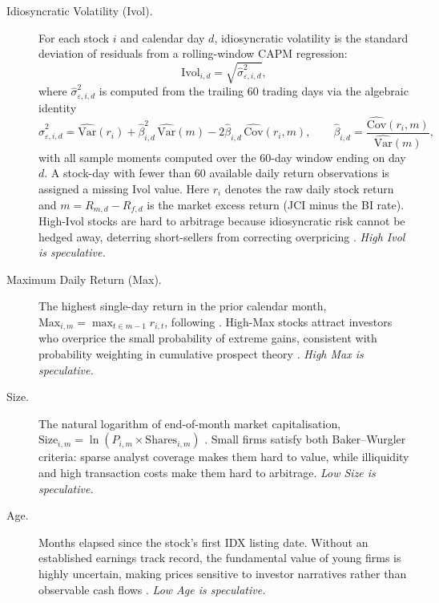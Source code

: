 \documentclass[
	a4paper,
	10pt,
	twoside,
]{LTJournalArticle}
\begin{document}
\begin{description}

  \item[Idiosyncratic Volatility (Ivol).]
  For each stock $i$ and calendar day $d$, idiosyncratic volatility is the
  standard deviation of residuals from a rolling-window CAPM regression:
  \begin{equation*}
    \text{Ivol}_{i,d} = \sqrt{\hat{\sigma}^{2}_{\varepsilon, i, d}},
  \end{equation*}
  where $\hat{\sigma}^{2}_{\varepsilon, i, d}$ is computed from the trailing
  60 trading days via the algebraic identity
  \begin{equation*}
    \hat{\sigma}^{2}_{\varepsilon, i, d}
      = \widehat{\text{Var}}(r_{i}) + \hat{\beta}_{i,d}^{2}\,\widehat{\text{Var}}(m)
        - 2\hat{\beta}_{i,d}\,\widehat{\text{Cov}}(r_{i}, m),
    \qquad
    \hat{\beta}_{i,d} = \frac{\widehat{\text{Cov}}(r_{i}, m)}{\widehat{\text{Var}}(m)},
  \end{equation*}
  with all sample moments computed over the 60-day window ending on day $d$.
  A stock-day with fewer than 60 available daily return observations is
  assigned a missing Ivol value. Here $r_{i}$ denotes the raw daily stock
  return and $m = R_{m,d} - R_{f,d}$ is the market excess return (JCI minus
  the BI rate). High-Ivol stocks are hard to arbitrage because idiosyncratic
  risk cannot be hedged away, deterring short-sellers from correcting
  overpricing \citep{shleifer1997}. \textit{High Ivol is speculative.}

  \item[Maximum Daily Return (Max).]
  The highest single-day return in the prior calendar month,
  $\text{Max}_{i,m} = \max_{t \in m-1} r_{i,t}$, following \citet{bali2011}.
  High-Max stocks attract investors who overprice the small probability of
  extreme gains, consistent with probability weighting in cumulative prospect
  theory \citep{barberis2008}. \textit{High Max is speculative.}

  \item[Size.]
  The natural logarithm of end-of-month market capitalisation,
  $\text{Size}_{i,m} = \ln(P_{i,m} \times \text{Shares}_{i,m})$ \citep{banz1981}.
  Small firms satisfy both Baker--Wurgler criteria: sparse analyst coverage
  makes them hard to value, while illiquidity and high transaction costs make
  them hard to arbitrage. \textit{Low Size is speculative.}

  \item[Age.]
  Months elapsed since the stock's first IDX listing date. Without an
  established earnings track record, the fundamental value of young firms is
  highly uncertain, making prices sensitive to investor narratives rather than
  observable cash flows \citep{barry1984}. \textit{Low Age is speculative.}


\end{description}
\end{document}
